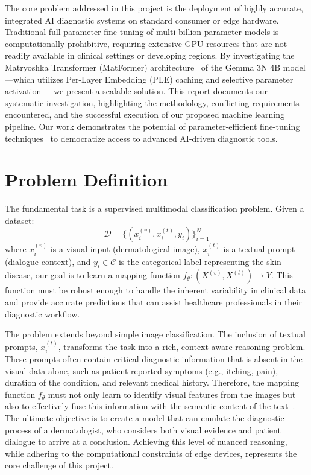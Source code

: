 \documentclass[11pt]{article}
\begin{document}
The core problem addressed in this project is the deployment of highly accurate, integrated AI diagnostic systems on standard consumer or edge hardware. Traditional full-parameter fine-tuning of multi-billion parameter models is computationally prohibitive, requiring extensive GPU resources that are not readily available in clinical settings or developing regions. By investigating the Matryoshka Transformer (MatFormer) architecture~\cite{kusupati2022matryoshka} of the Gemma 3N 4B model—which utilizes Per-Layer Embedding (PLE) caching and selective parameter activation~\cite{gemma_3n_2025}—we present a scalable solution. This report documents our systematic investigation, highlighting the methodology, conflicting requirements encountered, and the successful execution of our proposed machine learning pipeline. Our work demonstrates the potential of parameter-efficient fine-tuning techniques~\cite{hu2021lora} to democratize access to advanced AI-driven diagnostic tools.

\section{Problem Definition}
The fundamental task is a supervised multimodal classification problem. Given a dataset:
\begin{equation}
    \mathcal{D} = \{(x_i^{(v)}, x_i^{(t)}, y_i)\}_{i=1}^N
\end{equation}
where $x_i^{(v)}$ is a visual input (dermatological image), $x_i^{(t)}$ is a textual prompt (dialogue context), and $y_i \in \mathcal{C}$ is the categorical label representing the skin disease, our goal is to learn a mapping function $f_\theta: (X^{(v)}, X^{(t)}) \rightarrow Y$. This function must be robust enough to handle the inherent variability in clinical data and provide accurate predictions that can assist healthcare professionals in their diagnostic workflow.

The problem extends beyond simple image classification. The inclusion of textual prompts, $x_i^{(t)}$, transforms the task into a rich, context-aware reasoning problem. These prompts often contain critical diagnostic information that is absent in the visual data alone, such as patient-reported symptoms (e.g., itching, pain), duration of the condition, and relevant medical history. Therefore, the mapping function $f_\theta$ must not only learn to identify visual features from the images but also to effectively fuse this information with the semantic content of the text~\cite{acosta2022multimodal}. The ultimate objective is to create a model that can emulate the diagnostic process of a dermatologist, who considers both visual evidence and patient dialogue to arrive at a conclusion. Achieving this level of nuanced reasoning, while adhering to the computational constraints of edge devices, represents the core challenge of this project.
\end{document}
